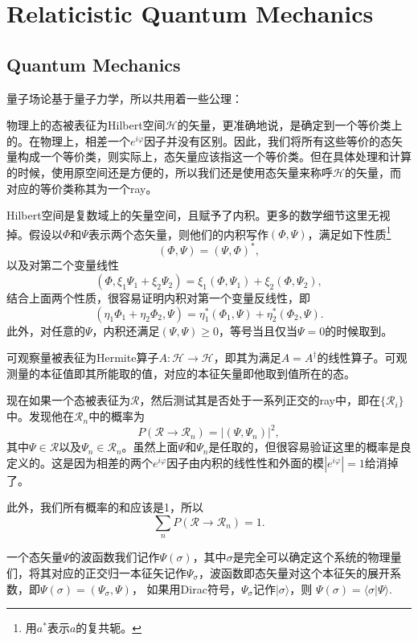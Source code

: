 \addtocounter{chapter}{1}
\chapter{Relaticistic Quantum Mechanics}
\section{Quantum Mechanics}
量子场论基于量子力学，所以共用着一些公理：

 物理上的态被表征为Hilbert空间$\mathcal{H}$的矢量，更准确地说，是确定到一个等价类上的。在物理上，相差一个$e^{i\varphi}$因子并没有区别。因此，我们将所有这些等价的态矢量构成一个等价类，则实际上，态矢量应该指这一个等价类。但在具体处理和计算的时候，使用原空间还是方便的，所以我们还是使用态矢量来称呼$\mathcal{H}$的矢量，而对应的等价类称其为一个ray。

Hilbert空间是复数域上的矢量空间，且赋予了内积。更多的数学细节这里无视掉。假设以$\Phi$和$\Psi$表示两个态矢量，则他们的内积写作$(\Phi,\Psi)$，满足如下性质\footnote{用$a^*$表示$a$的复共轭。}
\[
(\Phi,\Psi)=(\Psi,\Phi)^*,
\]
以及对第二个变量线性
\[
(\Phi,\xi_1\Psi_1+\xi_2\Psi_2)=\xi_1(\Phi,\Psi_1)+\xi_2(\Phi,\Psi_2),
\]
结合上面两个性质，很容易证明内积对第一个变量反线性，即
\[
(\eta_1\Phi_1+\eta_2\Phi_2,\Psi)=\eta_1^*(\Phi_1,\Psi)+\eta_2^*(\Phi_2,\Psi).
\]
此外，对任意的$\Psi$，内积还满足$(\Psi,\Psi)\geq 0$，等号当且仅当$\Psi=0$的时候取到。

 可观察量被表征为Hermite算子$A:\mathcal{H}\to\mathcal{H}$，即其为满足$A=A^{\dag}$的线性算子。可观测量的本征值即其所能取的值，对应的本征矢量即他取到值所在的态。

 现在如果一个态被表征为$\mathscr{R}$，然后测试其是否处于一系列正交的ray中，即在$\{\mathscr{R}_i\}$中。发现他在$\mathscr{R}_n$中的概率为
\[
P(\mathscr{R}\to\mathscr{R}_n)=|(\Psi,\Psi_n)|^2,
\]
其中$\Psi\in \mathscr{R}$以及$\Psi_n\in \mathscr{R}_n$。虽然上面$\Psi$和$\Psi_n$是任取的，但很容易验证这里的概率是良定义的。这是因为相差的两个$e^{i\varphi}$因子由内积的线性性和外面的模$|e^{i\varphi}|=1$给消掉了。

此外，我们所有概率的和应该是1，所以
\[
\sum_n P(\mathscr{R}\to\mathscr{R}_n)=1.
\]

一个态矢量$\Psi$的波函数我们记作$\Psi(\sigma)$，其中$\sigma$是完全可以确定这个系统的物理量们，将其对应的正交归一本征矢记作$\Psi_\sigma$，波函数即态矢量对这个本征矢的展开系数，即$\Psi(\sigma)=(\Psi_\sigma,\Psi)$，
如果用Dirac符号，$\Psi_\sigma$记作$|\sigma\rangle$，则
$
	\Psi(\sigma)=\langle \sigma|\Psi\rangle.
$

